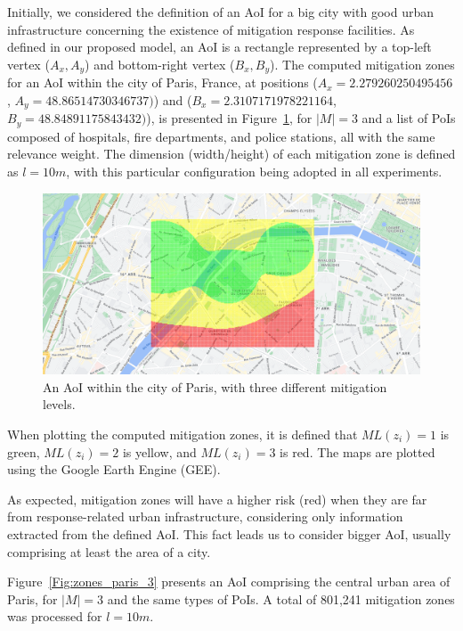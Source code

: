\begin{refsection}
Initially, we considered the definition of an AoI for a big city with good urban infrastructure concerning the existence of mitigation response facilities. As defined in our proposed model, an AoI is a rectangle represented by a top-left vertex ($A_x,A_y$) and bottom-right vertex ($B_x,B_y$). The computed mitigation zones for an AoI within the city of Paris, France, at positions ($A_x = 2.279260250495456$, $A_y = 48.86514730346737)$) and ($B_x = 2.3107171978221164$, $B_y = 48.84891175843432)$), is presented in Figure~\ref{Fig:zones_paris_0}, for $|M|=3$ and a list of PoIs composed of hospitals, fire departments, and police stations, all with the same relevance weight. The dimension (width/height) of each mitigation zone is defined as $l = 10m$, with this particular configuration being adopted in all experiments.

\begin{figure}[ht!]
  \centering
  \includegraphics[width=0.9\linewidth]{Chapters/3-EDUs/images/eiffel_M3.png}
  \caption{An AoI within the city of Paris, with three different mitigation levels.}\label{Fig:zones_paris_0}
\end{figure}

When plotting the computed mitigation zones, it is defined that $ML(z_i)=1$ is green, $ML(z_i)=2$ is yellow, and $ML(z_i)=3$ is red. The maps are plotted using the Google Earth Engine (GEE).

As expected, mitigation zones will have a higher risk (red) when they are far from response-related urban infrastructure, considering only information extracted from the defined AoI. This fact leads us to consider bigger AoI, usually comprising at least the area of a city.

Figure~\ref{Fig:zones_paris_3} presents an AoI comprising the central urban area of Paris, for $|M|=3$ and the same types of PoIs. A total of 801,241 mitigation zones was processed for $l = 10m$.


\end{refsection}
